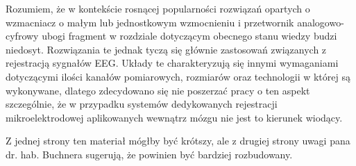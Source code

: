 


\begin{frame}[t]
    \begin{block}{\dk}
    \end{block}

    Rozumiem, że w kontekście rosnącej popularności rozwiązań opartych o wzmacniacz o małym lub jednostkowym wzmocnieniu i przetwornik analogowo-cyfrowy ubogi fragment w rozdziale dotyczącym obecnego stanu wiedzy budzi niedosyt.
    Rozwiązania te jednak tyczą  się głównie zastosowań związanych z rejestracją sygnałów EEG. Układy  te charakteryzują się innymi wymaganiami dotyczącymi ilości kanałów pomiarowych, rozmiarów oraz technologii w której są wykonywane, dlatego zdecydowano się nie poszerzać pracy o ten aspekt szczególnie, że w przypadku systemów dedykowanych rejestracji mikroelektrodowej aplikowanych wewnątrz mózgu nie jest to kierunek wiodący.

\end{frame}


\begin{frame}[t]
    \begin{block}{\dk}
    \end{block}
    Z jednej strony ten materiał mógłby być krótszy, ale z drugiej strony uwagi pana dr. hab. Buchnera sugerują, że powinien być bardziej rozbudowany.
    

\end{frame}

